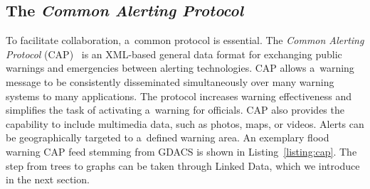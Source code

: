 \documentclass[letterpaper]{article}
\begin{document}
\subsection{The \emph{Common Alerting Protocol}}
To facilitate collaboration, a~common protocol is essential.
The \emph{Common Alerting Protocol} (CAP)~\cite{westfall2010cap}
is an XML-based general data format for exchanging public warnings
and emergencies between alerting technologies.
CAP allows a~warning message to be consistently disseminated simultaneously
over many warning systems to many applications.
The protocol increases warning effectiveness and
simplifies the task of activating a~warning for officials.
CAP also provides the capability to include multimedia data,
such as photos, maps, or videos.
Alerts can be geographically targeted to a~defined warning area.
An exemplary flood warning CAP feed stemming from GDACS is shown in
Listing~\ref{listing:cap}.
The step from trees to graphs can be taken through Linked Data,
which we introduce in the next section.
\end{document}
